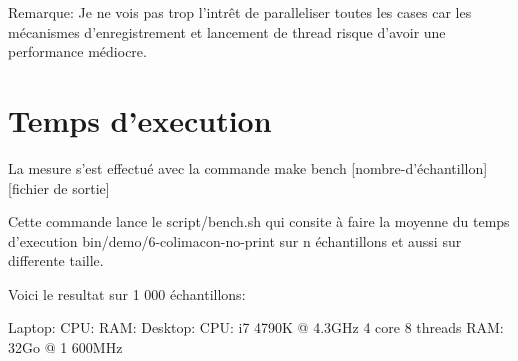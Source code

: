 \documentclass[a4paper]{article}
\begin{document}
Remarque: Je ne vois pas trop l'intrêt de paralleliser toutes les cases car
les mécanismes d'enregistrement et lancement de thread risque d'avoir une
performance médiocre.

\section{Temps d'execution}

La mesure s'est effectué avec la commande make bench [nombre-d'échantillon]
[fichier de sortie]

Cette commande lance le script/bench.sh qui consite à faire la moyenne du temps
d'execution bin/demo/6-colimacon-no-print sur n échantillons et aussi
sur differente taille.

Voici le resultat sur 1 000 échantillons:




Laptop:
CPU:
RAM:
Desktop:
CPU: i7 4790K @ 4.3GHz 4 core 8 threads
RAM: 32Go @ 1 600MHz


\end{document}
